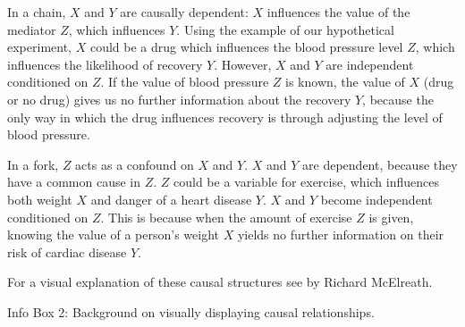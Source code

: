 \documentclass[nobib]{tufte-handout}
\begin{document}
\begin{InfoBox}
{\begin{minipage}{1\textwidth}
\begin{center}
    \end{center}
    
    \vspace{-1.25cm}
    In a chain, $X$ and $Y$ are causally dependent: $X$ influences the value of the mediator $Z$, which influences $Y$. 
    Using the example of our hypothetical experiment, $X$ could be a drug which influences the blood pressure level $Z$, which influences the likelihood of recovery $Y$.
    However, $X$ and $Y$ are independent conditioned on $Z$.
    If the value of blood pressure $Z$ is known, the value of $X$ (drug or no drug) gives us no further information about the recovery $Y$, because the only way in which the drug influences recovery is through adjusting the level of blood pressure.

    In a fork, $Z$ acts as a confound on $X$ and $Y$. 
    $X$ and $Y$ are dependent, because they have a common cause in $Z$. 
    $Z$ could be a variable for exercise, which influences both weight $X$ and danger of a heart disease $Y$.
    $X$ and $Y$ become independent conditioned on $Z$. 
    This is because when the amount of exercise $Z$ is given, knowing the value of a person's weight $X$ yields no further information on their risk of cardiac disease $Y$.

    For a visual explanation of these causal structures see  \href{https://youtu.be/mBEA7PKDmiY?si=Ihio7ZXJSuct4J30}{{\color{Red}{this lecture}}} by Richard McElreath.
    \medskip
  \end{minipage} 
}
\begin{center}
Info Box 2: Background on visually displaying causal relationships.
\end{center}
\end{InfoBox}
\end{document}
